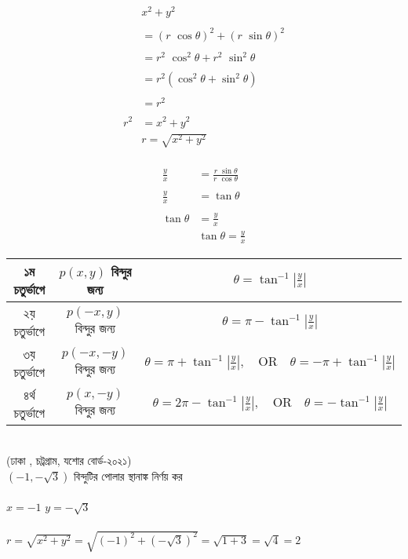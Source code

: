 \documentclass{article}
\begin{document}
	\begin{multicols}{2}
		\begin{align*}
			&x^2+y^2\\
			\\
			&=(r\,\,\cos \theta)^2+(r\,\,\sin \theta)^2\\
			\\
			&=r^2\,\,\cos^2 \theta+r^2\,\,\sin^2 \theta\\
			\\
			&=r^2(\cos^2 \theta+\sin^2 \theta)\\
			\\
			&=r^2\\
			\\
			r^2&=x^2+y^2\\
			&\boxed{r=\sqrt{x^2+y^2}}
		\end{align*}
		\\
		\begin{align*}
			\frac{y}{x}&=\frac{r\,\,\sin \theta}{r\,\,\cos \theta}\\
			\\
			\frac{y}{x}&=\tan \theta\\
			\\
			\tan \theta &=\frac{y}{x}\\
			&\boxed{\tan \theta =\frac{y}{x}}
		\end{align*}
	\end{multicols}
	\begin{tabular}{|c|c|c|}
		\hline
		১ম চতুর্ভাগে & $p(x,y)$ বিন্দুর জন্য & $\theta= \tan^{-1}|\frac{y}{x}|$\\
		\hline 
		২য় চতুর্ভাগে & $p(-x,y)$ বিন্দুর জন্য & $\theta= \pi - \tan^{-1}|\frac{y}{x}|$\\
		\hline
		৩য় চতুর্ভাগে & $p(-x,-y)$ বিন্দুর জন্য & $\theta= \pi+\tan^{-1}|\frac{y}{x}|,\quad \mbox{OR}\quad \theta= -\pi+\tan^{-1}|\frac{y}{x}| $\\
		\hline
		৪র্থ  চতুর্ভাগে & $p(x,-y)$ বিন্দুর জন্য & $\theta= 2\pi-\tan^{-1}|\frac{y}{x}|,\quad \mbox{OR}\quad \theta= -\tan^{-1}|\frac{y}{x}| $\\
		\hline
	\end{tabular}
	\\
	(ঢাকা , চট্রগ্রাম, যশোর বোর্ড-২০২১)\\
	$(-1,-\sqrt{3})$ বিন্দুটির পোলার স্থানাঙ্ক নির্ণয় কর \\ 
	\\
	$x=-1$ $y=-\sqrt{3}$\\
	\\
	$r=\sqrt{x^2+y^2}=\sqrt{(-1)^2+(-\sqrt{3})^2}=\sqrt{1+3}=\sqrt{4}=2$\\
\end{document}

